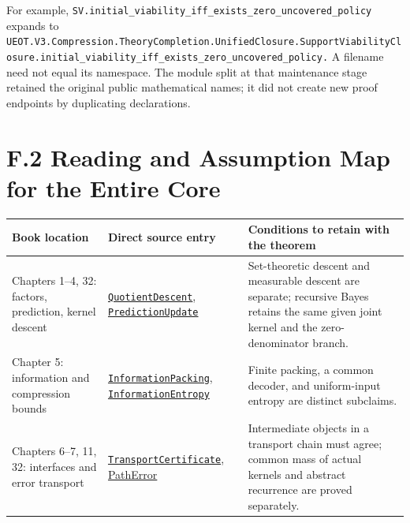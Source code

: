 \documentclass[
  english,
  11pt,
  oneside]{book}
\newcounter{none} %
\begin{document}
For example, \nolinkurl{SV.initial_viability_iff_exists_zero_uncovered_policy} expands to \nolinkurl{UEOT.V3.Compression.TheoryCompletion.UnifiedClosure.SupportViabilityClosure.initial_viability_iff_exists_zero_uncovered_policy.} A filename need not equal its namespace. The module split at that maintenance stage retained the original public mathematical names; it did not create new proof endpoints by duplicating declarations.

\section{F.2 Reading and Assumption Map for the Entire Core}\label{f-core-map}

{\def\LTcaptype{none} %
\begin{longtable}[]{@{}
  >{\raggedright\arraybackslash}p{}
  >{\raggedright\arraybackslash}p{}
  >{\raggedright\arraybackslash}p{}@{}}
\toprule\noalign{}
\begin{minipage}[b]{\linewidth}\raggedright
Book location
\end{minipage} & \begin{minipage}[b]{\linewidth}\raggedright
Direct source entry
\end{minipage} & \begin{minipage}[b]{\linewidth}\raggedright
Conditions to retain with the theorem
\end{minipage} \\
\midrule\noalign{}
\endhead
\bottomrule\noalign{}
\endlastfoot
Chapters 1--4, 32: factors, prediction, kernel descent & \href{../formalization/ueot-core/UEOT/V3/Compression/QuotientDescent.lean}{\nolinkurl{QuotientDescent}}, \href{../formalization/ueot-core/UEOT/V3/PredictionUpdate.lean}{\nolinkurl{PredictionUpdate}} & Set-theoretic descent and measurable descent are separate; recursive Bayes retains the same given joint kernel and the zero-denominator branch. \\
Chapter 5: information and compression bounds & \href{../formalization/ueot-core/UEOT/V3/InformationPacking.lean}{\nolinkurl{InformationPacking}}, \href{../formalization/ueot-core/UEOT/V3/InformationEntropy.lean}{\nolinkurl{InformationEntropy}} & Finite packing, a common decoder, and uniform-input entropy are distinct subclaims. \\
Chapters 6--7, 11, 32: interfaces and error transport & \href{../formalization/ueot-core/UEOT/V3/Compression/TransportCertificate.lean}{\nolinkurl{TransportCertificate}}, \href{../formalization/ueot-core/UEOT/V3/PathError.lean}{PathError} & Intermediate objects in a transport chain must agree; common mass of actual kernels and abstract recurrence are proved separately. \\

\end{longtable}}
\end{document}
